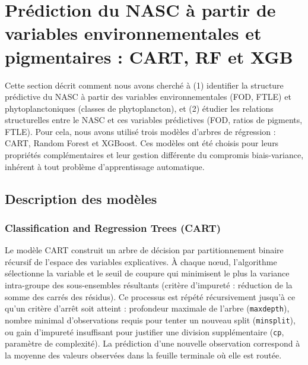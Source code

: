 \documentclass[11pt,a4paper,oneside]{report}
\begin{document}
	
	\section{Prédiction du NASC à partir de variables environnementales et pigmentaires : CART, RF et XGB}
	Cette section décrit comment nous avons cherché à (1) identifier la structure prédictive du NASC à partir des variables environnementales (FOD, FTLE) et phytoplanctoniques (classes de phytoplancton), et (2) étudier les relations structurelles entre le NASC et ces variables prédictives (FOD, ratios de pigments, FTLE). Pour cela, nous avons utilisé trois modèles d'arbres de régression : CART, Random Forest et XGBoost. Ces modèles ont été choisis pour leurs propriétés complémentaires et leur gestion différente du compromis biais-variance, inhérent à tout problème d'apprentissage automatique.
	
	
	
	\subsection{Description des modèles}
	\subsubsection{Classification and Regression Trees (CART)}
	Le modèle CART \cite{breiman1984classification} construit un arbre de décision par partitionnement binaire récursif de l'espace des variables explicatives. À chaque nœud, l'algorithme sélectionne la variable et le seuil de coupure qui minimisent le plus la variance intra-groupe des sous-ensembles résultants (critère d'impureté : réduction de la somme des carrés des résidus). Ce processus est répété récursivement jusqu'à ce qu'un critère d'arrêt soit atteint : profondeur maximale de l'arbre (\texttt{maxdepth}), nombre minimal d'observations requis pour tenter un nouveau split (\texttt{minsplit}), ou gain d'impureté insuffisant pour justifier une division supplémentaire (\texttt{cp}, paramètre de complexité). La prédiction d'une nouvelle observation correspond à la moyenne des valeurs observées dans la feuille terminale où elle est routée.
	
\end{document}
